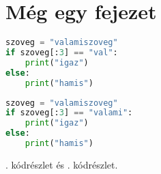 \chapter{Még egy fejezet}
\label{chap:fejezet2}

\begin{lstlisting}[caption={Hogyan ne írjunk kódot},label={lst:stringstartswith}, language={Python}]
szoveg = "valamiszoveg"
if szoveg[:3] == "val":
    print("igaz")
else:
    print("hamis")
\end{lstlisting}

\begin{lstlisting}[caption={Miből lehet probléma},label={lst:stringstartswith2}, language={Python}]
szoveg = "valamiszoveg"
if szoveg[:3] == "valami":
    print("igaz")
else:
    print("hamis")
\end{lstlisting}

. kódrészlet és . kódrészlet.